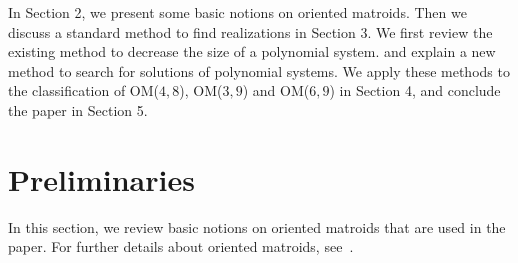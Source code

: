 \documentclass{article}
\newtheorem{cor}[thm]{\bfseries Corollary}
\begin{document}
In Section 2, we present some basic notions on oriented matroids.
Then we discuss a standard method to find realizations in Section 3.
We first review the existing method to decrease the size of a polynomial system.
and explain a new method to search for solutions of polynomial systems.
We apply these methods to the classification of OM($4,8$), OM($3,9$) 
and OM($6,9$) in Section 4,
and conclude the paper in Section 5.



\section{Preliminaries}
In this section, we review basic notions on oriented matroids that are
used in the paper. 
For further details about oriented matroids, see~\cite{BLSWZ99}.
\end{document}
